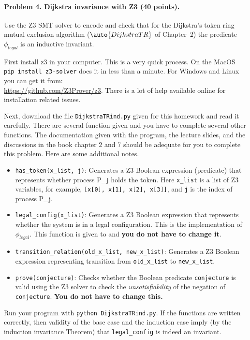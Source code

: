 \documentclass[11pt]{article}
\begin{document}
\paragraph{Problem 4. Dijkstra invariance with Z3 (40 points).}
Use the Z3 SMT solver to encode and check that for the Dijkstra's token ring mutual exclusion algorithm ($\auto{DijkstraTR}$ of Chapter~2) the predicate $\phi_{\mathit{legal}}$ is an inductive invariant.

First install z3 in your computer. This is a very quick process. On the MacOS \texttt{pip install z3-solver} does it in less than a minute. For Windows and Linux you can get it from: \\  \href{https://github.com/Z3Prover/z3}{https://github.com/Z3Prover/z3}. There is a lot of help available online for installation related issues.

Next, download the file \texttt{DijkstraTRind.py} given for this homework and read it carefully. There are several function given and you have to complete several other functions. The documentation given with the program, the lecture slides, and the discussions in the book chapter 2 and 7 should be adequate for you to complete this problem. Here are some additional notes.

\begin{itemize}
\item \texttt{has\_token(x\_list, j)}: Generates a Z3 Boolean expression (predicate) that represents whether process P\_j holds the token. Here  \texttt{x\_list} is a list of Z3 variables, for example, \texttt{[x[0], x[1], x[2], x[3]]}, and  \texttt{j} is the index of process P\_j.
\item \texttt{legal\_config(x\_list)}: Generates a Z3 Boolean expression that represents whether the system is in a legal configuration. This is the implementation of $\phi_{\mathit{legal}}$. This function is given to and {\bf you do not have to change it\/}.
%
\item \texttt{transition\_relation(old\_x\_list, new\_x\_list)}: Generates a Z3 Boolean expression representing transition from \texttt{old\_x\_list} to \texttt{new\_x\_list}.
\item \texttt{prove(conjecture)}: Checks whether the Boolean predicate \texttt{conjecture} is valid using the Z3 solver to check the {\em unsatisfiability\/} of the negation of \texttt{conjecture}. {\bf You do not have to change this.\/}
\end{itemize}

Run your program with \texttt{python DijkstraTRind.py}. If the functions are written correctly, then validity of the base case and the induction case imply (by the induction invariance Theorem) that \texttt{legal\_config} is indeed an invariant.
\end{document}
